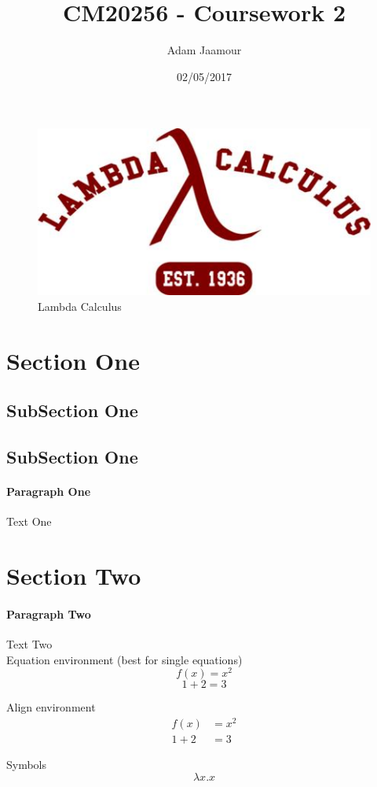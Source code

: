 \documentclass{article}
\title{CM20256 - Coursework 2}
\date{02/05/2017}
\author{Adam Jaamour}
\begin{document}
\begin{figure}
\includegraphics[width=\linewidth]{images/lambda-calculus.jpg}
\caption{Lambda Calculus}
\label{fig:lambda-calculus}
\end{figure}
\maketitle
\newpage
\tableofcontents
{}
\newpage
{}

\section{Section One}
\subsection{SubSection One}
\subsection{SubSection One}
\paragraph{Paragraph One}
Text One

\section{Section Two}
\paragraph{Paragraph Two}
Text Two\\

Equation environment (best for single equations)
\begin{equation*}
f(x) = x^2
\end{equation*}
\begin{equation*}
1 + 2 = 3
\end{equation*}

Align environment
\begin{align*}
f(x) &= x^2\\
1 + 2 &= 3
\end{align*}

Symbols
\begin{equation*}
\lambda x.x
\end{equation*}
\end{document}
